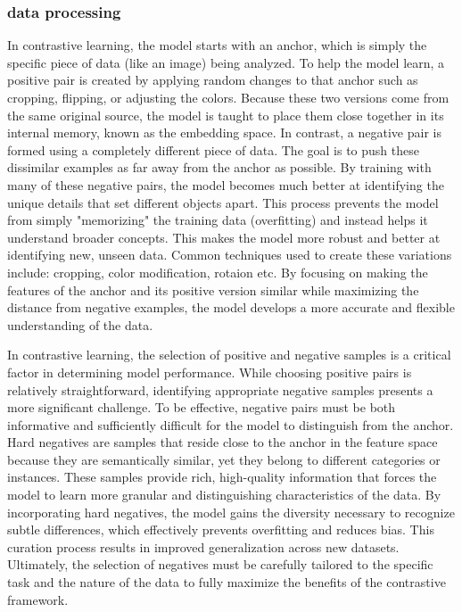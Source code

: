 \subsubsection{data processing}
In contrastive learning, the model starts with an anchor, which is simply the specific piece of data (like an image) being analyzed. 
To help the model learn, a positive pair is created by applying random changes to that anchor such as cropping, flipping, or adjusting the colors. 
Because these two versions come from the same original source, the model is taught to place them close together in its internal memory, known as the embedding space.
In contrast, a negative pair is formed using a completely different piece of data. 
The goal is to push these dissimilar examples as far away from the anchor as possible. 
By training with many of these negative pairs, the model becomes much better at identifying the unique details that set different objects apart.
This process prevents the model from simply "memorizing" the training data (overfitting) and instead helps it understand broader concepts. 
This makes the model more robust and better at identifying new, unseen data. Common techniques used to create these variations include: cropping, color modification, rotaion etc.
By focusing on making the features of the anchor and its positive version similar while maximizing the distance from negative examples, the model develops a more accurate and flexible understanding of the data.


In contrastive learning, the selection of positive and negative samples is a critical factor in determining model performance. 
While choosing positive pairs is relatively straightforward, identifying appropriate negative samples presents a more significant challenge. 
To be effective, negative pairs must be both informative and sufficiently difficult for the model to distinguish from the anchor.
Hard negatives are samples that reside close to the anchor in the feature space because they are semantically similar, yet they belong to different categories or instances. \citep{jang2023difficulty}
These samples provide rich, high-quality information that forces the model to learn more granular and distinguishing characteristics of the data. 
By incorporating hard negatives, the model gains the diversity necessary to recognize subtle differences, which effectively prevents overfitting and reduces bias. 
This curation process results in improved generalization across new datasets. 
Ultimately, the selection of negatives must be carefully tailored to the specific task and the nature of the data to fully maximize the benefits of the contrastive framework. \citep[p.4+5]{hu2024comprehensive}


